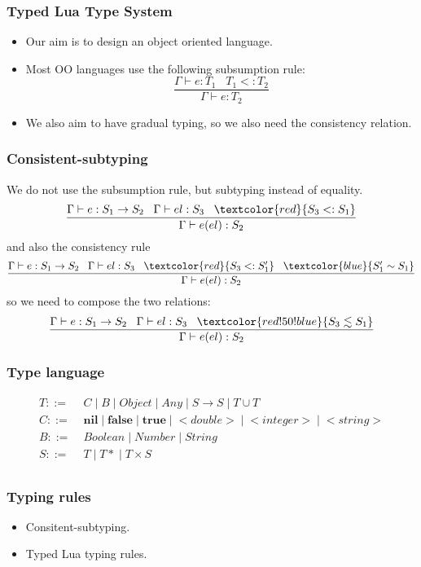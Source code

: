 \documentclass{beamer}
\newcommand{\subtype}{<:}
\newcommand{\pipe}{|\;}
\newcommand{\env}{\Gamma}
\begin{document}
\begin{frame}
\frametitle{Typed Lua Type System}
\begin{itemize}
\item Our aim is to design an object oriented language.
\item Most OO languages use the following subsumption rule:
\[
\frac{\env \vdash e:T_{1} \;\;\; T_{1} \subtype T_{2}}
     {\env \vdash e:T_{2}}
\]
\item We also aim to have gradual typing, so we also
need the consistency relation.
\end{itemize}
\end{frame}

\begin{frame}
\frametitle{Consistent-subtyping}
We do not use the subsumption rule, but subtyping
instead of equality.
\[
\frac{\env \vdash e:S_{1} \rightarrow S_{2} \;\;\;
      \env \vdash el:S_{3} \;\;\;
      \textcolor{red}{S_{3} \subtype S_{1}}}
     {\env \vdash e(el):S_{2}}
\]
and also the consistency rule
\[
\frac{\env \vdash e:S_{1} \rightarrow S_{2} \;\;\;
      \env \vdash el:S_{3} \;\;\;
      \textcolor{red}{S_{3} \subtype S_{1}'} \;\;\;
      \textcolor{blue}{S_{1}' \sim S_{1}}}
     {\env \vdash e(el):S_{2}}
\]
so we need to compose the two relations:
\[
\frac{\env \vdash e:S_{1} \rightarrow S_{2} \;\;\;
      \env \vdash el:S_{3} \;\;\;
      \textcolor{red!50!blue}{S_{3} \lesssim S_{1}}}
     {\env \vdash e(el):S_{2}}
\]
\end{frame}

\begin{frame}
\frametitle{Type language}
\begin{align*}
T ::= \; & C \; \pipe B \; \pipe Object \; \pipe Any \; \pipe
S \rightarrow S \; \pipe T \cup T\\
C ::= \; & \mathbf{nil} \; \pipe \mathbf{false} \; \pipe \mathbf{true} \;
\pipe {<}double{>} \; \pipe {<}integer{>} \; \pipe {<}string{>}\\
B ::= \; & Boolean \; \pipe Number \; \pipe String\\
S ::= \; & T \; \pipe {T*} \; \pipe T \times S\\ 
\end{align*}
\end{frame}

\begin{frame}
\frametitle{Typing rules}
\begin{itemize}
\item Consitent-subtyping.
\item Typed Lua typing rules.
\end{itemize}
\end{frame}
\end{document}
